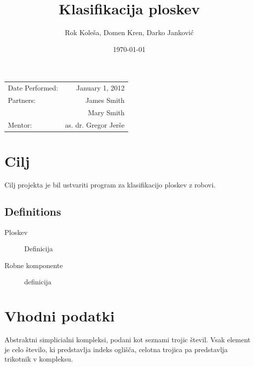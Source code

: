 \documentclass{article}
\title{Klasifikacija ploskev} %
\author{Rok Koleša, Domen Kren, Darko Janković} %
\date{\today} %
\begin{document}
\maketitle %

\begin{center}
\begin{tabular}{l r}
Date Performed: & January 1, 2012 \\ %
Partners: & James Smith \\ %
& Mary Smith \\
Mentor: & as. dr. Gregor Jerše %
\end{tabular}
\end{center}



\section{Cilj}
Cilj projekta je bil ustvariti program za klasifikacijo ploskev z robovi.

\subsection{Definitions}
\label{definitions}
\begin{description}
\item[Ploskev]
Definicija
\item[Robne komponente]
definicija
\end{description} 
 

\section{Vhodni podatki}
Abstraktni simplicialni kompleksi, podani kot seznami trojic števil. Vsak element je celo število, ki predstavlja indeks oglišča, celotna trojica pa predstavlja trikotnik v kompleksu.
\end{document}
